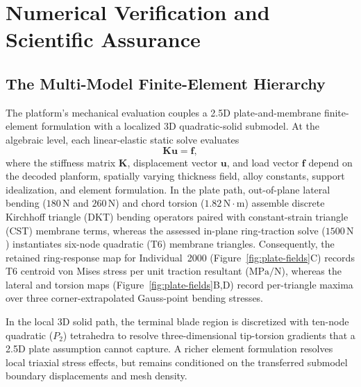 \section{Numerical Verification and Scientific Assurance}
\label{sec:verification}

\subsection{The Multi-Model Finite-Element Hierarchy}
The platform's mechanical evaluation couples a 2.5D plate-and-membrane finite-element formulation with a localized 3D quadratic-solid submodel. At the algebraic level, each linear-elastic static solve evaluates
\begin{equation}
 \mathbf K\mathbf u = \mathbf f,
\end{equation}
where the stiffness matrix $\mathbf K$, displacement vector $\mathbf u$, and load vector $\mathbf f$ depend on the decoded planform, spatially varying thickness field, alloy constants, support idealization, and element formulation. In the plate path, out-of-plane lateral bending ($180\,\mathrm{N}$ and $260\,\mathrm{N}$) and chord torsion ($1.82\,\mathrm{N\cdot m}$) assemble discrete Kirchhoff triangle (DKT) bending operators paired with constant-strain triangle (CST) membrane terms, whereas the assessed in-plane ring-traction solve ($1500\,\mathrm{N}$) instantiates six-node quadratic (T6) membrane triangles. Consequently, the retained ring-response map for Individual~2000 (Figure~\ref{fig:plate-fields}C) records T6 centroid von Mises stress per unit traction resultant ($\mathrm{MPa/N}$), whereas the lateral and torsion maps (Figure~\ref{fig:plate-fields}B,D) record per-triangle maxima over three corner-extrapolated Gauss-point bending stresses.

In the local 3D solid path, the terminal blade region is discretized with ten-node quadratic ($P_2$) tetrahedra to resolve three-dimensional tip-torsion gradients that a 2.5D plate assumption cannot capture. A richer element formulation resolves local triaxial stress effects, but remains conditioned on the transferred submodel boundary displacements and mesh density.

